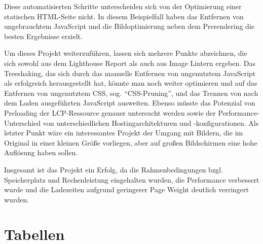 \documentclass[11pt,a4paper]{article}
\begin{document}
Diese automatisierten Schritte unterscheiden sich von der Optimierung einer statischen HTML-Seite nicht.
In diesem Beispielfall haben das Entfernen von ungebrauchtem JavaScript und die Bildoptimierung neben dem Prerendering die besten Ergebnisse erzielt.

Um dieses Projekt weiterzuführen, lassen sich mehrere Punkte abzeichnen, die sich sowohl aus dem Lighthouse Report als auch aus Image Lintern ergeben.
Das Treeshaking, das sich durch das manuelle Entfernen von ungenutztem JavaScript als erfolgreich herausgestellt hat, könnte man noch weiter optimieren und auf das Entfernen von ungenutztem CSS, sog. \enquote{CSS-Pruning}, und das Trennen von nach dem Laden ausgeführten JavaScript ausweiten.
Ebenso müsste das Potenzial von Preloading der LCP-Ressource genauer untersucht werden sowie der Performance-Unterschied von unterschiedlichen Hostingarchitekturen und -konfigurationen.
Als letzter Punkt wäre ein interessantes Projekt der Umgang mit Bildern, die im Original in einer kleinen Größe vorliegen, aber auf großen Bildschirmen eine hohe Auflösung haben sollen.

Insgesamt ist das Projekt ein Erfolg, da die Rahmenbedingungen bzgl. Speicherplatz und Rechenleistung eingehalten wurden, die Performance verbessert wurde und die Ladezeiten aufgrund geringerer Page Weight deutlich verringert wurden.

\appendix
\section{Tabellen}
\end{document}
